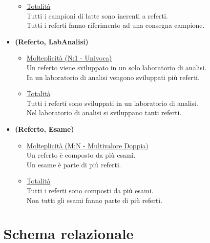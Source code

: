 \documentclass[12pt]{report}
\begin{document}
\begin{itemize}
\begin{itemize}
		\item \underline{Totalità} \\ [2mm]
		    Tutti i campioni di latte sono inerenti a referti.\\
		    Tutti i referti fanno riferimento ad una consegna campione.
	\end{itemize}

\item \textbf{(Referto, LabAnalisi) }
	\begin{itemize}
		\item \underline{Molteplicità (N:1 - Univoca) } \\ [2mm]
            Un referto viene sviluppato in un solo laboratorio di analisi.\\
            In un laboratorio di analisi vengono sviluppati più referti.

		\item \underline{Totalità} \\ [2mm]
		    Tutti i referti sono sviluppati in un laboratorio di analisi.\\
		    Nel laboratorio di analisi si sviluppano tanti referti.
	\end{itemize}

\newpage
	
\item \textbf{(Referto, Esame) }
	\begin{itemize}
		\item \underline{Molteplicità (M:N - Multivalore Doppia) } \\ [2mm]
            Un referto è composto da più esami.\\
            Un esame è parte di più referti.\\
		\item \underline{Totalità} \\ [2mm]
		    Tutti i referti sono composti da più esami.\\
		    Non tutti gli esami fanno parte di più referti.
	\end{itemize}

\end{itemize}

\section{Schema relazionale}
\end{document}
